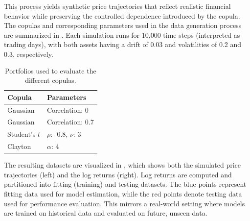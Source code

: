 This process yields synthetic price trajectories that reflect realistic financial behavior while preserving the controlled dependence introduced by the copula. The copulas and corresponding parameters used in the data generation process are summarized in . Each simulation runs for 10,000 time steps (interpreted as trading days), with both assets having a drift of 0.03 and volatilities of 0.2 and 0.3, respectively.

\begin{table}[h!]
    \centering
    \caption{Portfolios used to evaluate the different copulas.}
    \begin{tabular}{ll}
    \textbf{Copula} & \textbf{Parameters} \\
    \hline
    Gaussian & Correlation: 0 \\
    Gaussian & Correlation: 0.7\\
    Student's $t$ & $\rho$: -0.8, $\nu$: 3\\
    Clayton & $\alpha$: 4 \\
    \end{tabular}
    \label{tab:DatasetsUsed}
\end{table}

The resulting datasets are visualized in , which shows both the simulated price trajectories (left) and the log returns (right). Log returns are computed and partitioned into fitting (training) and testing datasets. The blue points represent fitting data used for model estimation, while the red points denote testing data used for performance evaluation. This mirrors a real-world setting where models are trained on historical data and evaluated on future, unseen data.

